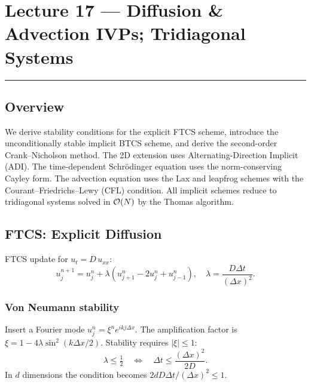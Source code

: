 
\section{Lecture 17 — Diffusion \& Advection IVPs; Tridiagonal Systems}\label{sec:lec17}
\hrule\vspace{1.5em}

\subsection*{Overview}
We derive stability conditions for the explicit FTCS scheme,
introduce the unconditionally stable implicit BTCS scheme,
and derive the second-order Crank–Nicholson method.
The 2D extension uses Alternating-Direction Implicit (ADI).
The time-dependent Schrödinger equation uses the norm-conserving
Cayley form.  The advection equation uses the Lax and leapfrog
schemes with the Courant–Friedrichs–Lewy (CFL) condition.
All implicit schemes reduce to tridiagonal systems solved in $\mathcal{O}\!\left(N\right)$
by the Thomas algorithm.

\subsection{FTCS: Explicit Diffusion}\label{subsec:lec17:ftcs}

FTCS update for $u_t = D\,u_{xx}$:
\begin{equation}
  u_j^{n+1} = u_j^n + \lambda(u_{j+1}^n - 2u_j^n + u_{j-1}^n),
  \quad \lambda = \frac{D\Delta t}{(\Delta x)^2}.
  \label{eq:lec17:ftcs}
\end{equation}

\subsubsection*{Von Neumann stability}
Insert a Fourier mode $u_j^n = \xi^n e^{ikj\Delta x}$.  The
amplification factor is $\xi = 1 - 4\lambda\sin^2(k\Delta x/2)$.
Stability requires $|\xi|\le 1$:
\begin{equation}
  \boxed{\lambda \le \tfrac{1}{2}}
  \quad\Leftrightarrow\quad
  \Delta t \le \frac{(\Delta x)^2}{2D}.
  \label{eq:lec17:ftcs_stability}
\end{equation}
In $d$ dimensions the condition becomes $2dD\Delta t/(\Delta x)^2 \le 1$.

